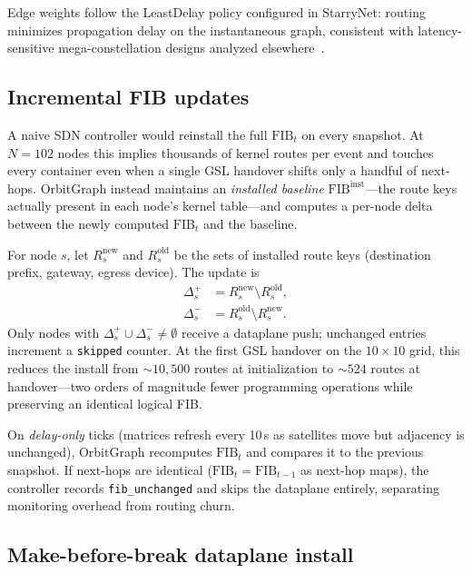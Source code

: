 Edge weights follow the LeastDelay policy configured in StarryNet: routing
minimizes propagation delay on the instantaneous graph, consistent with
latency-sensitive mega-constellation designs analyzed
elsewhere~\cite{handley:ground-relays:2019,lai2020starperf}.

\subsection{Incremental FIB updates}
\label{sec:incremental}

A naive SDN controller would reinstall the full $\mathrm{FIB}_t$ on every
snapshot.
At $N{=}102$ nodes this implies thousands of kernel routes per event and
touches every container even when a single GSL handover shifts only a handful of
next-hops.
OrbitGraph instead maintains an \emph{installed baseline}
$\mathrm{FIB}^{\mathrm{inst}}$---the route keys actually present in each
node's kernel table---and computes a per-node delta between the newly computed
$\mathrm{FIB}_t$ and the baseline.

For node $s$, let $R_s^{\mathrm{new}}$ and $R_s^{\mathrm{old}}$ be the sets of
installed route keys (destination prefix, gateway, egress device).
The update is
\begin{align}
  \Delta_s^{+} &= R_s^{\mathrm{new}} \setminus R_s^{\mathrm{old}},
  \label{eq:to-add}\\
  \Delta_s^{-} &= R_s^{\mathrm{old}} \setminus R_s^{\mathrm{new}}.
  \label{eq:to-del}
\end{align}
Only nodes with $\Delta_s^{+} \cup \Delta_s^{-} \neq \emptyset$ receive a
dataplane push; unchanged entries increment a \texttt{skipped} counter.
At the first GSL handover on the $10{\times}10$ grid, this reduces the install
from ${\sim}10{,}500$ routes at initialization to ${\sim}524$ routes at
handover---two orders of magnitude fewer programming operations while preserving
an identical logical FIB.

On \emph{delay-only} ticks (matrices refresh every 10\,s as satellites move
but adjacency is unchanged), OrbitGraph recomputes $\mathrm{FIB}_t$ and compares
it to the previous snapshot.
If next-hops are identical ($\mathrm{FIB}_t = \mathrm{FIB}_{t-1}$ as next-hop
maps), the controller records \texttt{fib\_unchanged} and skips the dataplane
entirely, separating monitoring overhead from routing churn.

\subsection{Make-before-break dataplane install}
\label{sec:mbb}


